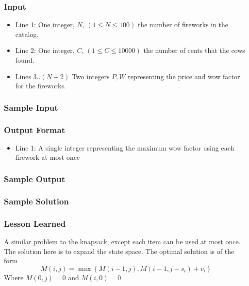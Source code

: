 \subsubsection{Input}
\begin{itemize}
	\item Line 1: One integer, $N$, $(1 \leq N \leq 100)$ the number of fireworks in the catalog.
	\item Line 2: One integer, $C$, $(1 \leq C \leq 10000)$ the number of cents that the cows found.
	\item Lines 3..$(N+2)$ Two integers $P,W$ representing the price and wow factor for the fireworks.
\end{itemize}

\subsubsection{Sample Input}

\subsubsection{Output Format}
\begin{itemize}
	\item Line 1: A single integer representing the maximum wow factor using each firework at most once
\end{itemize}
\subsubsection{Sample Output}

\subsubsection{Sample Solution}

\subsubsection{Lesson Learned}
A similar problem to the knapsack, except each item can be used at most once.  The solution here is to expand the state space.  The optimal solution is of the form
$$M(i,j) = \max \left\{ M(i-1, j) , M(i-1, j- s_i) + v_i \right\}$$
Where $M(0,j) = 0$ and $M(i,0) = 0$

